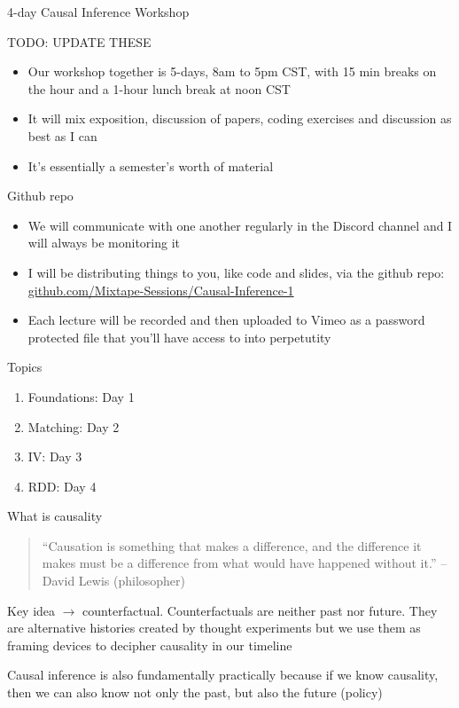 \documentclass{beamer}
\begin{document}
\begin{frame}{4-day Causal Inference Workshop}

  TODO: UPDATE THESE
  \begin{itemize}
    \item Our workshop together is 5-days, 8am to 5pm CST, with 15 min breaks on the hour and a 1-hour lunch break at noon CST
    \item It will mix exposition, discussion of papers, coding exercises and discussion as best as I can
    \item It's essentially a semester's worth of material
  \end{itemize}

\end{frame}

\begin{frame}{Github repo}

  \begin{itemize}
    \item We will communicate with one another regularly in the Discord channel and I will always be monitoring it
    \item I will be distributing things to you, like code and slides, via the github repo: \url{github.com/Mixtape-Sessions/Causal-Inference-1}
    \item Each lecture will be recorded and then uploaded to Vimeo as a password protected file that you'll have access to into perpetutity
  \end{itemize}

\end{frame}

\begin{frame}{Topics}

  \begin{enumerate}
    \item Foundations: Day 1
    \item Matching: Day 2
    \item IV: Day 3
    \item RDD: Day 4
  \end{enumerate}

\end{frame}

\begin{frame}{What is causality}

  \begin{quote}
    ``Causation is something that makes a difference, and the difference it makes must be a difference from what would have happened without it.'' -- David Lewis (philosopher)
  \end{quote}

  \bigskip
  Key idea $\rightarrow$ counterfactual. Counterfactuals are neither past nor future.  They are alternative histories created by thought experiments but we use them as framing devices to decipher causality in our timeline

  \bigskip

  Causal inference is also fundamentally practically because if we know causality, then we can also know not only the past, but also the future (policy)

\end{frame}
\end{document}
